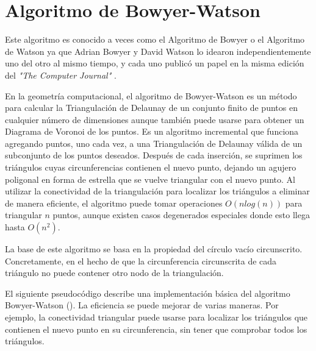 \section{Algoritmo de Bowyer-Watson}

Este algoritmo es conocido a veces como el Algoritmo de Bowyer o el Algoritmo de Watson ya que Adrian Bowyer y David Watson lo idearon independientemente uno del otro al mismo tiempo, y cada uno publicó un papel en la misma edición del \textit{"The Computer Journal"} .
\vspace{0.3cm}

En la geometría computacional, el algoritmo de Bowyer-Watson es un método para calcular la Triangulación de Delaunay de un conjunto finito de puntos en cualquier número de dimensiones aunque también puede usarse para obtener un Diagrama de Voronoi de los puntos. Es un algoritmo incremental que funciona agregando puntos, uno cada vez, a una Triangulación de Delaunay válida de un subconjunto de los puntos deseados. Después de cada inserción, se suprimen los triángulos cuyas circunferencias contienen el nuevo punto, dejando un agujero poligonal en forma de estrella que se vuelve triangular con el nuevo punto. Al utilizar la conectividad de la triangulación para localizar los triángulos a eliminar de manera eficiente, el algoritmo puede tomar operaciones $O(nlog(n))$ para triangular $n$ puntos, aunque existen casos degenerados especiales donde esto llega hasta $O(n^2)$.
\vspace{0.3cm}

La base de este algoritmo se basa en la propiedad del círculo vacío circunscrito. Concretamente, en el hecho de que la circunferencia circunscrita de cada triángulo no puede contener otro nodo de la triangulación. 

El siguiente pseudocódigo describe una implementación básica del algoritmo Bowyer-Watson (\cite{b-w}). La eficiencia se puede mejorar de varias maneras. Por ejemplo, la conectividad triangular puede usarse para localizar los triángulos que contienen el nuevo punto en su circunferencia, sin tener que comprobar todos los triángulos. 

